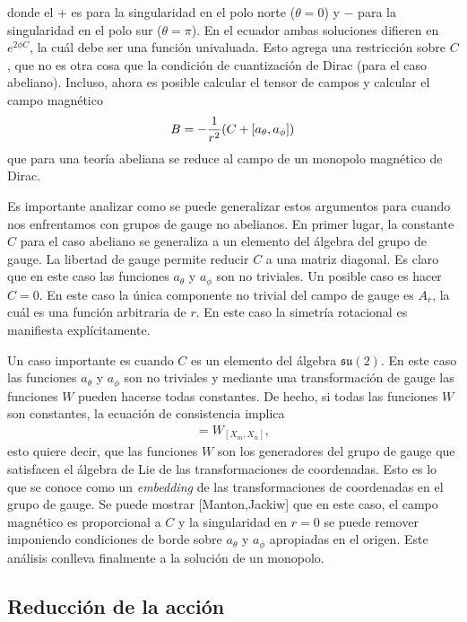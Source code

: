 donde el $+$ es para la singularidad en el polo norte ($\theta=0$) y $-$ para la singularidad en el polo sur ($\theta=\pi$). En el ecuador ambas soluciones difieren en $e^{2\phi C}$, la cuál debe ser una función univaluada. Esto agrega una restricción sobre $C$, que no es otra cosa que la condición de cuantización de Dirac (para el caso abeliano). Incluso, ahora es posible calcular el tensor de campos y calcular el campo magnético
\begin{align}
	B = -\frac{1}{r^2}(C+[a_\theta,a_\phi])
\end{align}
que para una teoría abeliana se reduce al campo de un monopolo magnético de Dirac.

Es importante analizar como se puede generalizar estos argumentos para cuando nos enfrentamos con grupos de gauge no abelianos. En primer lugar, la constante $C$ para el caso abeliano se generaliza a un elemento del álgebra del grupo de gauge. La libertad de gauge permite reducir $C$ a una matriz diagonal. Es claro  que en este caso las funciones $a_\theta$ y $a_\phi$ son no triviales. Un posible caso es hacer $C=0$. En este caso la única componente no trivial del campo de gauge es $A_r$, la cuál es una función arbitraria de $r$. En este caso la simetría rotacional es manifiesta explícitamente.

Un caso importante es cuando $C$ es un elemento del álgebra $\mathfrak{su}(2)$. En este caso las funciones $a_\theta$ y $a_\phi$ son no triviales y mediante una transformación de gauge las funciones $W$ pueden hacerse todas constantes. De hecho, si todas las funciones $W$ son constantes, la ecuación de consistencia implica
\begin{align}
	[W_m,W_n] = W_{[X_m,X_n]},
\end{align}
esto quiere decir, que las funciones $W$ son los generadores del grupo de gauge que satisfacen el álgebra de Lie de las transformaciones de coordenadas. Esto es lo que se conoce como un \emph{embedding} de las transformaciones de coordenadas en el grupo de gauge. Se puede mostrar [Manton,Jackiw] que en este caso, el campo magnético es proporcional a $C$ y la singularidad en $r=0$ se puede remover imponiendo condiciones de borde sobre $a_\theta$ y $a_\phi$ apropiadas en el origen. Este análisis conlleva finalmente a la solución de un monopolo.


\subsection{Reducción de la acción}

